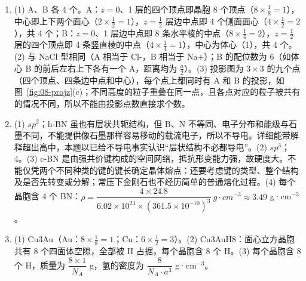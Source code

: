\documentclass[UTF8,a4paper,zihao=5,oneside,openany,fontset=none]{ctexbook}
\def\rho{ρ}\def\lambda{λ}\def\mu{μ}\def\theta{θ}%
\def\mathrm#1{#1}\def\text#1{#1}\def\ensuremath#1{#1}\def\ce#1{#1}%
\newenvironment{jiexilist}{\small\begin{enumerate}[label={\textbf{\arabic*}.},leftmargin=1.6em,itemsep=0.3em,topsep=0.2em]}{\end{enumerate}}
\begin{document}
\begin{jiexilist}
\item (1) A、B 各 4 个。A：$z=0$、1 层的四个顶点即晶胞 8 个顶点（$8\times\frac18=1$），中心即上下两个面心（$2\times\frac12=1$），$z=\frac12$ 层边中点即 4 个侧面面心（$4\times\frac12=2$），共 4 个；B：$z=0$、1 层边中点即 8 条水平棱的中点（$8\times\frac14=2$），$z=\frac12$ 层的四个顶点即 4 条竖直棱的中点（$4\times\frac14=1$），中心为体心（1），共 4 个。(2) 与 \ce{NaCl} 型相同（A 相当于 \ce{Cl-}，B 相当于 \ce{Na+}）；B 的配位数为 6（如体心 B 的前后左右上下各有一个 A，距离均为 $\frac a2$）。(3) 投影图为 $3\times3$ 的九个点（四个顶点、四条边中点和中心），每个点上都同时有 A 和 B 的投影，如图~\ref{fig:08-projz}(c)；不同高度的粒子重叠在同一点，且各点对应的粒子被共有的情况不同，所以不能由投影点数直接求个数。
\item (1) $\mathrm{sp}^2$；h-BN 虽也有层状共轭结构，但 B、N 不等同、电子分布和能级与石墨不同，不能提供像石墨那样容易移动的载流电子，所以不导电。详细能带解释超出高中，本题以已给不导电事实认识“层状结构不必都导电”。(2) $\mathrm{sp}^3$；4。(3) c-BN 是由强共价键构成的空间网络，抵抗形变能力强，故硬度大。不能仅凭两个不同种类的键的键长确定晶体熔点：还要考虑键的类型、整个结构及是否先转变或分解；常压下金刚石也不经历简单的普通熔化过程。(4) 每个晶胞含 4 个 BN：$\rho=\dfrac{4\times24.8}{6.02\times10^{23}\times(361.5\times10^{-10})^3}\ \text{g·cm}^{-3}\approx3.49$ g·cm$^{-3}$。
\item (1) \ce{Cu3Au}（Au：$8\times\frac18=1$；Cu：$6\times\frac12=3$）。(2) \ce{Cu3AuH8}：面心立方晶胞共有 8 个四面体空隙，全部被 H 占据，每个晶胞含 8 个 H。(3) 每个晶胞含 8 个 H，质量为 $\dfrac{8\times1}{N_\text{A}}$ g，氢的密度为 $\dfrac{8}{N_\text{A}\cdot a^3}$ g·cm$^{-3}$。
\end{jiexilist}
\newcommand{\cninebenz}[3][0.5]{%
  \draw[c9bond] (90:#1) \foreach \k in {1,...,5}{ -- ({90-60*\k}:#1)} -- cycle;
  \draw[c9bond] (0,0) circle ({0.6*#1});
  \foreach \p/\t in {#2}{%
    \pgfmathtruncatemacro\cnineang{150-60*\p}%
    \pgfmathtruncatemacro\cnineanc{mod(\cnineang+540,360)}%
    \draw[c9bond] (\cnineang:#1) -- (\cnineang:{1.5*#1}) node[c9atom,anchor=\cnineanc]{\t};}
  \foreach \p/\t in {#3}{\node[c9mk] at ({150-60*\p}:{1.4*#1}) {\t};}
}
\newcommand{\cninewedge}[2]{\fill ($(#1)!0.22cm!(#2)$) -- ($($(#2)!0.22cm!(#1)$)!0.07cm!90:(#1)$) -- ($($(#2)!0.22cm!(#1)$)!0.07cm!-90:(#1)$) -- cycle;}
\newcommand{\cninesk}[1]{{\setchemfig{atom sep=1.65em}\small\chemfig{#1}}}
\end{document}
